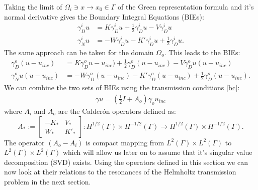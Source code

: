 \documentclass[a4paper, oneside]{discothesis}
\begin{document}
Taking the limit of $\Omega_i \ni x \rightarrow x_0 \in \Gamma$ of the Green representation formula and it's normal derivative gives the Boundary Integral Equations (BIEs):
\begin{align}
	\gamma_D^iu &= K\gamma_D^iu + \frac{1}{2}\gamma_D^iu - V\gamma_D^iu \\
	\gamma_N^iu &= -W\gamma_D^iu - K'\gamma_D^iu + \frac{1}{2}\gamma_D^iu.
\end{align}
The same approach can be taken for the domain $\Omega_o$.
This leads to the BIEs:
\begin{align}
	\gamma_D^o(u-u_{inc}) &= K\gamma_D^ou-u_{inc}) + \frac{1}{2}\gamma_D^o(u-u_{inc}) - V\gamma_D^ou(u-u_{inc}) \\
	\gamma_N^ou(u-u_{inc}) &= -W\gamma_D^o(u-u_{inc}) - K'\gamma_D^o(u-u_{inc}) + \frac{1}{2}\gamma_D^o(u-u_{inc}).
\end{align}
We can combine the two sets of BIEs using the transmission conditions \ref{bc}:
\begin{align}
	[I + (A_o-A_i)] \gamma u = (\frac{1}{2}I + A_o)\gamma_o u_{inc} \label{BIE}
\end{align}
where $A_i$ and $A_o$ are the Calderón operators defined as:
\begin{equation}
	A_* :=
	\begin{bmatrix}
		-K_* & V_* \\
		W_* & K'_*
	\end{bmatrix}
	: H^{1/2}(\Gamma)\times H^{-1/2}(\Gamma) \longrightarrow H^{1/2}(\Gamma)\times H^{-1/2}(\Gamma). \label{BIEtot}
\end{equation}
The operator $(A_o-A_i)$ is compact mapping from $L^2(\Gamma)\times L^2(\Gamma)$ to $L^2(\Gamma)\times L^2(\Gamma)$ which will allow us later on to assume that it's singular value decomposition (SVD) exists.
Using the operators defined in this section we can now look at their relations to the resonances of the Helmholtz transmission problem in the next section.
\end{document}
